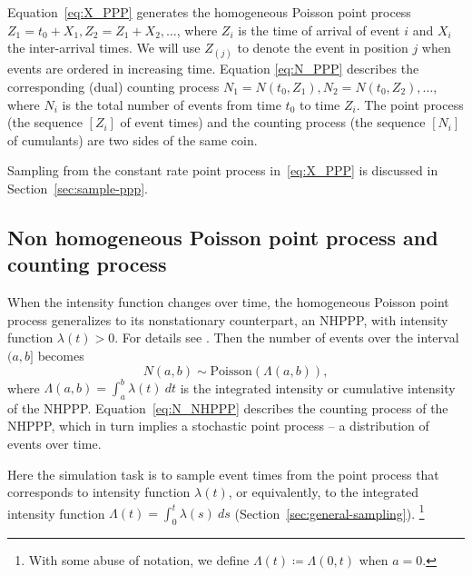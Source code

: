 \documentclass[article,nojss]{jss}\usepackage[]{graphicx}\usepackage[]{xcolor}
\begin{document}
Equation~\eqref{eq:X_PPP} generates the homogeneous Poisson point process ${Z_1 = t_0 + X_1, Z_2 = Z_1 + X_2, \dots}$, where $Z_i$ is the time of arrival of event $i$ and $X_i$ the inter-arrival times. We will use $Z_{(j)}$ to denote the event in position $j$ when events are ordered in increasing time.
%
Equation \eqref{eq:N_PPP} describes the corresponding (dual) counting process
${N_1 = N(t_0, Z_1)}, {N_2 = N(t_0, Z_2), \dots}$, where $N_i$ is the total number of events from time $t_0$ to time $Z_i$. The point process (the sequence $[Z_i]$ of event times) and the counting process (the sequence $[N_i]$ of cumulants) are two sides of the same coin.

Sampling from the constant rate point process in~\eqref{eq:X_PPP} is discussed in Section~\ref{sec:sample-ppp}.


\subsection{Non homogeneous Poisson point process and counting process}\label{sec:nhppp-intro}
When the intensity function changes over time, the homogeneous Poisson point process generalizes to its nonstationary counterpart, an NHPPP, with intensity function $\lambda(t) > 0$. For details see \citet[par 4.2]{cox1965theory}. Then the number of events over the interval $(a, b]$ becomes
\begin{equation}\label{eq:N_NHPPP}
N(a, b) \sim \text{Poisson}(\Lambda(a, b)),
\end{equation}
where $\Lambda(a, b) = \int_a^b \lambda(t) \ dt$ is the integrated intensity or cumulative intensity of the NHPPP. Equation~\eqref{eq:N_NHPPP} describes the counting process of the NHPPP, which in turn implies a stochastic point process -- a distribution of events over time.

Here the simulation task is to sample event times from the point process that corresponds to intensity function $\lambda(t)$, or equivalently, to the integrated intensity function $\Lambda(t) = \int_0^t \lambda(s) \ ds$ (Section~\ref{sec:general-sampling}).%
\footnote{With some abuse of notation, we define $\Lambda(t) \coloneqq \Lambda(0, t)$ when  $a=0$.}
\end{document}
